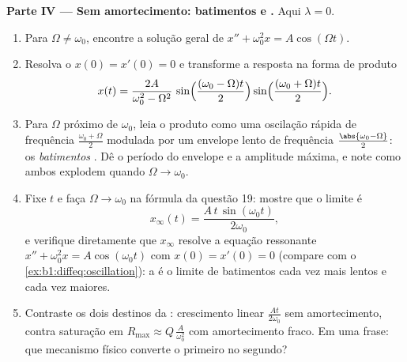 \begin{problem}
\medskip
\noindent\textbf{Parte IV --- Sem amortecimento: batimentos e .}
Aqui $\lambda = 0$.
\begin{enumerate}
  \item Para $\Omega \neq \omega_0$, encontre a solução geral de
        $x'' + \omega_0^2 x = A\cos(\Omega t)$.
  \item Resolva o  $x(0) = x'(0) = 0$ e transforme
        a resposta na forma de produto
        \[
        x(t) = \frac{2A}{\omega_0^2 - \Omega^2}\,
        \sin\Bigl(\frac{(\omega_0 - \Omega)t}2\Bigr)
        \sin\Bigl(\frac{(\omega_0 + \Omega)t}2\Bigr) .
        \]
  \item Para $\Omega$ próximo de $\omega_0$, leia o produto como uma
        oscilação rápida de frequência $\frac{\omega_0 + \Omega}2$
        modulada por um envelope lento de frequência
        $\frac{\abs{\omega_0 - \Omega}}2$: os \emph{batimentos}
        . Dê o período do envelope e a
        amplitude máxima, e note como ambos explodem quando $\Omega
        \to \omega_0$.
  \item Fixe $t$ e faça $\Omega \to \omega_0$ na fórmula da questão 19:
        mostre que o limite é
        \[
        x_\infty(t) = \frac{A\,t\,\sin(\omega_0 t)}{2\omega_0} ,
        \]
        e verifique diretamente que $x_\infty$ resolve a equação
        ressonante $x'' + \omega_0^2 x = A\cos(\omega_0 t)$ com
        $x(0) = x'(0) = 0$ (compare com o
        \cref{ex:b1:diffeq:oscillation}): a  é o limite
        de batimentos cada vez mais lentos e cada vez maiores.
  \item Contraste os dois destinos da : crescimento linear
        $\frac{At}{2\omega_0}$ sem amortecimento, contra saturação
        em $R_{\max} \approx Q\,\frac{A}{\omega_0^2}$ com amortecimento
        fraco. Em uma frase: que mecanismo físico converte
        o primeiro no segundo?
\end{enumerate}


\end{problem}
